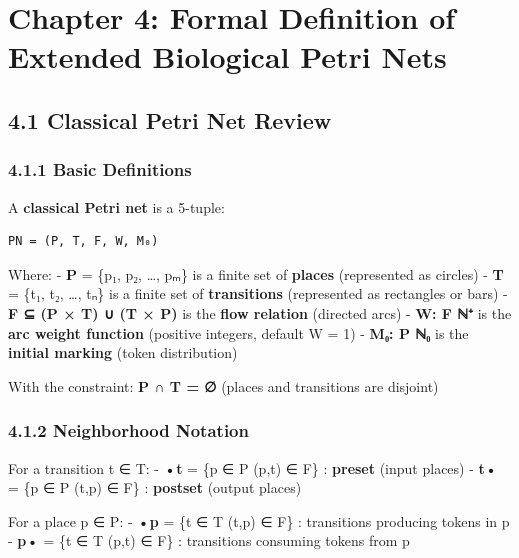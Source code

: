 \hypertarget{chapter-4-formal-definition-of-extended-biological-petri-nets}{%
\chapter{Chapter 4: Formal Definition of Extended Biological Petri
Nets}\label{chapter-4-formal-definition-of-extended-biological-petri-nets}}

\hypertarget{classical-petri-net-review}{%
\section{4.1 Classical Petri Net
Review}\label{classical-petri-net-review}}

\hypertarget{basic-definitions}{%
\subsection{4.1.1 Basic Definitions}\label{basic-definitions}}

A \textbf{classical Petri net} is a 5-tuple:

\begin{lstlisting}
PN = (P, T, F, W, M₀)
\end{lstlisting}

Where: - \textbf{P} = \{p₁, p₂, \ldots, pₘ\} is a finite set of
\textbf{places} (represented as circles) - \textbf{T} = \{t₁, t₂,
\ldots, tₙ\} is a finite set of \textbf{transitions} (represented as
rectangles or bars) - \textbf{F ⊆ (P × T) ∪ (T × P)} is the \textbf{flow
relation} (directed arcs) - \textbf{W: F \textrightarrow ℕ⁺} is the \textbf{arc weight
function} (positive integers, default W = 1) - \textbf{M₀: P \textrightarrow ℕ₀} is
the \textbf{initial marking} (token distribution)

With the constraint: \textbf{P ∩ T = ∅} (places and transitions are
disjoint)

\hypertarget{neighborhood-notation}{%
\subsection{4.1.2 Neighborhood Notation}\label{neighborhood-notation}}

For a transition t ∈ T: - \textbf{•t} = \{p ∈ P \textbar{} (p,t) ∈ F\} :
\textbf{preset} (input places) - \textbf{t•} = \{p ∈ P \textbar{} (t,p)
∈ F\} : \textbf{postset} (output places)

For a place p ∈ P: - \textbf{•p} = \{t ∈ T \textbar{} (t,p) ∈ F\} :
transitions producing tokens in p - \textbf{p•} = \{t ∈ T \textbar{}
(p,t) ∈ F\} : transitions consuming tokens from p

